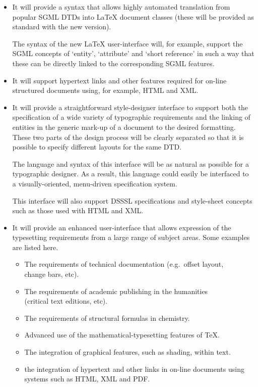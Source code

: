 \documentclass[a4paper]{article}
\newcommand{\eg}{e.g.~}
\newcommand{\SGML}{{\sc SGML}}
\newcommand{\DSSSL}{{\sc DSSSL}}
\newcommand{\HTML}{{\sc HTML}}
\newcommand{\XML}{{\sc XML}}
\newcommand{\PDF}{{\sc PDF}}
\begin{document}
 \begin{itemize}
 \item
 It will provide a syntax that allows highly automated translation
 from popular \SGML{} DTDs into \LaTeX{} document classes (these 
 will be provided as standard with the new version).

 The syntax of the new \LaTeX{} user-interface will, for example,
 support the \SGML{} concepts of `entity', `attribute' and `short
 reference' in such a way that these can be directly linked to the
 corresponding  \SGML{} features.

 \item
 It will support hypertext links and other features required for
 on-line structured documents using, for example, \HTML{} and \XML{}.

\item
 It will provide a straightforward style-designer interface to support
 both the specification of a wide variety of typographic requirements
 and the linking of entities in the generic mark-up of a document to
 the desired formatting.  These two parts of the design process will
 be clearly separated so that it is possible to specify different
 layouts for the same DTD.

 The language and syntax of this interface will be as natural as
 possible for a typographic designer.  As a result, this language
 could easily be interfaced to a visually-oriented, menu-driven
 specification system.

 This interface will also support \DSSSL{} specifications and 
 style-sheet concepts such as those used with \HTML{} and \XML{}.
 
 \item
 It will provide an enhanced user-interface that allows expression of
 the typesetting requirements from a large range of subject areas. Some
 examples are listed here.
 
 \begin{itemize}
 \item The requirements of technical documentation (\eg offset layout,\\
   change bars, etc).
 \item The requirements of academic publishing in the humanities\\
   (critical text editions, etc).
 \item The requirements of structural formulas in chemistry.
 \item Advanced use of the mathematical-typesetting features of \TeX{}.
 \item The integration of graphical features, such as shading,
   within text.
 \item the integration of hypertext and other links in on-line
   documents using systems such as \HTML{}, \XML{} and \PDF{}.
   

\end{itemize}
\end{itemize}
\end{document}
